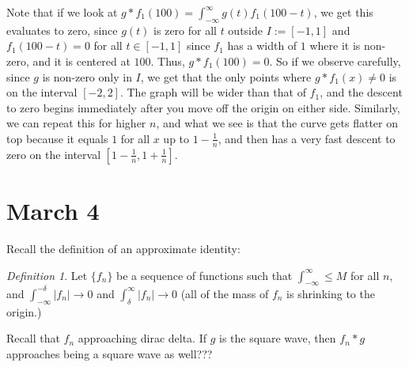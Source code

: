 \documentclass{article}
\theoremstyle{plain}
\theoremstyle{remark}
\newtheorem{definition}{Definition}
\begin{document}
Note that if we look at $g * f_1(100) = \int_{-\infty}^\infty g(t)f_1(100-t)$,
we get this evaluates to zero, since $g(t)$ is zero for all $t$
outside $I := [-1,1]$ and $f_1(100-t) = 0$ for all $t \in [-1,1]$
since $f_1$ has a width of $1$ where it is non-zero, and it is centered at $100$.
Thus, $g*f_1(100) = 0$.
So if we observe carefully, since $g$ is non-zero only in $I$,
we get that the only points where $g * f_1(x) \neq 0$ is on the interval $[-2,2]$.
The graph will be wider than that of $f_1$, and the descent to zero begins
immediately after you move off the origin on either side.
Similarly, we can repeat this for higher $n$,
and what we see is that the curve gets flatter on top because it equals $1$
for all $x$ up to $1 - \frac{1}{n}$,
and then has a very fast descent to zero on the interval $\left[1-\frac1n,
1+\frac{1}{n}\right]$.

\section{March 4}
Recall the definition of an approximate identity:
\begin{definition}
	Let $\{f_n\}$ be a sequence of functions such that $\int_{-\infty}^\infty \leq M$ for all $n$,
	and $\int_{-\infty}^{-\delta} |f_n| \to 0$ and $\int_{\delta}^\infty |f_n| \to 0$
	(all of the mass of $f_n$ is shrinking to the origin.)
\end{definition}
Recall that $f_n$ approaching dirac delta.
If $g$ is the square wave, then $f_n * g$ approaches being a square wave as well???
\end{document}
